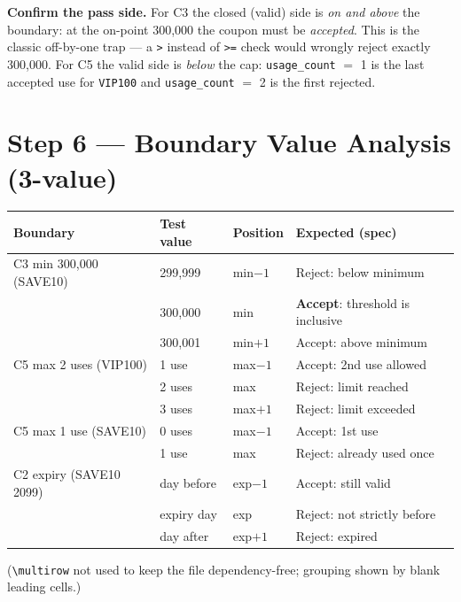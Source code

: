 \documentclass[11pt,a4paper]{article}
\newcommand{\code}[1]{\texttt{#1}}
\begin{document}
\noindent\textbf{Confirm the pass side.} For C3 the closed (valid) side is
\emph{on and above} the boundary: at the on-point 300{,}000 the coupon must be
\emph{accepted}. This is the classic off-by-one trap --- a \code{>} instead of
\code{>=} check would wrongly reject exactly 300{,}000. For C5 the valid side is
\emph{below} the cap: \code{usage\_count} $=$ 1 is the last accepted use for
\code{VIP100} and \code{usage\_count} $=$ 2 is the first rejected.

\section{Step 6 --- Boundary Value Analysis (3-value)}

\begin{center}
\begin{longtable}{@{}L{4.0cm} C{2.3cm} C{2.6cm} L{5.2cm}@{}}
\toprule
\textbf{Boundary} & \textbf{Test value} & \textbf{Position} & \textbf{Expected (spec)} \\
\midrule
\endhead
C3 min 300{,}000 (SAVE10) & 299{,}999 & min$-1$ & Reject: below minimum \\
                          & 300{,}000 & min     & \textbf{Accept}: threshold is inclusive \\
                          & 300{,}001 & min$+1$ & Accept: above minimum \\
\midrule
C5 max 2 uses (VIP100)    & 1 use     & max$-1$ & Accept: 2nd use allowed \\
                          & 2 uses    & max     & Reject: limit reached \\
                          & 3 uses    & max$+1$ & Reject: limit exceeded \\
\midrule
C5 max 1 use (SAVE10)     & 0 uses    & max$-1$ & Accept: 1st use \\
                          & 1 use     & max     & Reject: already used once \\
\midrule
C2 expiry (SAVE10 2099)   & day before & exp$-1$ & Accept: still valid \\
                          & expiry day & exp     & Reject: not strictly before \\
                          & day after  & exp$+1$ & Reject: expired \\
\bottomrule
\end{longtable}
\end{center}
\noindent\footnotesize (\code{\textbackslash multirow} not used to keep the file
dependency-free; grouping shown by blank leading cells.)\normalsize
\end{document}
